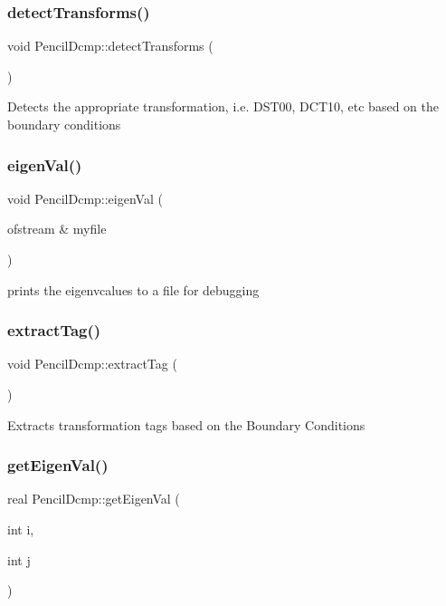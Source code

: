 \subsubsection{\texorpdfstring{detect\+Transforms()}{detectTransforms()}}
{\footnotesize\ttfamily void Pencil\+Dcmp\+::detect\+Transforms (\begin{DoxyParamCaption}{ }\end{DoxyParamCaption})}

Detects the appropriate transformation, i.\+e. D\+S\+T00, D\+C\+T10, etc based on the boundary conditions \mbox{\label{classPencilDcmp_ac4b1060595d90c99e2b81cc0c4622f60}} 
\subsubsection{\texorpdfstring{eigen\+Val()}{eigenVal()}}
{\footnotesize\ttfamily void Pencil\+Dcmp\+::eigen\+Val (\begin{DoxyParamCaption}\item[{ofstream \&}]{myfile }\end{DoxyParamCaption})}

prints the eigenvcalues to a file for debugging \mbox{\label{classPencilDcmp_a68f53a914a7dca2ddc7078468fb8e0f5}} 
\subsubsection{\texorpdfstring{extract\+Tag()}{extractTag()}}
{\footnotesize\ttfamily void Pencil\+Dcmp\+::extract\+Tag (\begin{DoxyParamCaption}{ }\end{DoxyParamCaption})}

Extracts transformation tags based on the Boundary Conditions \mbox{\label{classPencilDcmp_afa0acfd2badba2e06d1800f67fce3dba}} 
\subsubsection{\texorpdfstring{get\+Eigen\+Val()}{getEigenVal()}}
{\footnotesize\ttfamily real Pencil\+Dcmp\+::get\+Eigen\+Val (\begin{DoxyParamCaption}\item[{int}]{i,  }\item[{int}]{j }\end{DoxyParamCaption})}

